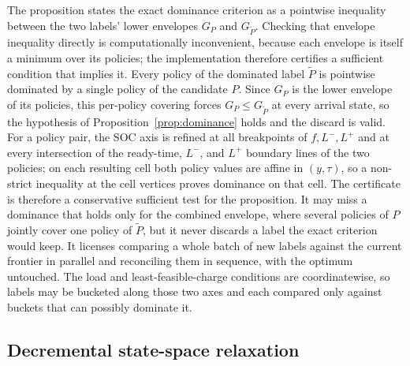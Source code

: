 \documentclass[review,3p,authoryear]{elsarticle}
\theoremstyle{plain}
\theoremstyle{definition}
\theoremstyle{remark}
\begin{document}
The proposition states the exact dominance criterion as a pointwise inequality between
the two labels' lower envelopes $G_P$ and $G_{\tilde P}$. Checking that envelope
inequality directly is computationally inconvenient, because each envelope is itself a
minimum over its policies; the implementation therefore certifies a sufficient condition that
implies it. Every policy of the dominated label $\tilde P$ is pointwise dominated by a
single policy of the candidate $P$. Since $G_P$ is the lower envelope of its
policies, this per-policy covering forces $G_P\le G_{\tilde P}$ at every arrival state,
so the hypothesis of Proposition~\ref{prop:dominance} holds and the discard is valid.
For a policy pair, the SOC axis is refined at all breakpoints of $f,L^-,L^+$ and at
every intersection of the ready-time, $L^-$, and $L^+$ boundary lines of the two
policies; on each resulting cell both policy values are affine in $(y,\tau)$, so a
non-strict inequality at the cell vertices proves dominance on that cell. The
certificate is therefore a conservative sufficient test for the proposition. It may
miss a dominance that holds only for the combined envelope, where several policies of
$P$ jointly cover one policy of $\tilde P$, but it never discards a label the exact
criterion would keep. It licenses comparing a whole batch of new labels against the
current frontier in parallel and reconciling them in sequence, with the optimum
untouched.
The load and least-feasible-charge conditions are coordinatewise, so labels may be
bucketed along those two axes and each compared only against buckets that can
possibly dominate it.

\subsection{Decremental state-space relaxation}
\label{sec:relax}
\end{document}
